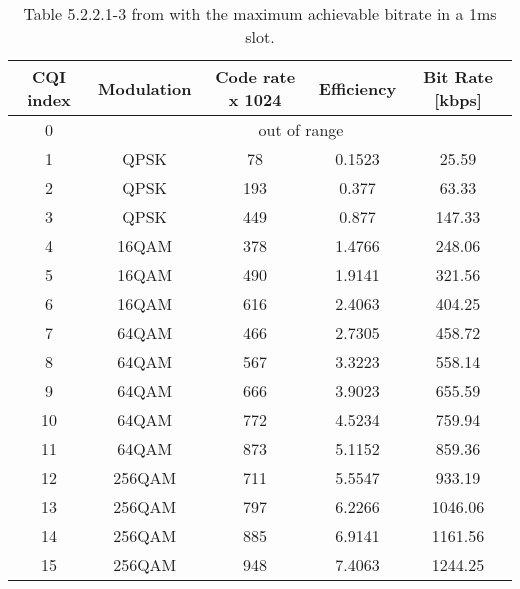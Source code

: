 \begin{itemize}
\begin{itemize}
        \begin{table}[h]
            \centering
            \caption{Table 5.2.2.1-3 from \cite{3gpp-codebooks} with the maximum achievable bitrate in a 1ms slot.}
            \label{tab:mcs}
            \begin{tabular}{|c|c|c|c|c|} 
            \hline
            CQI index & Modulation & Code rate x 1024 & Efficiency & Bit Rate [kbps]  \\ 
            \hline
            0         & \multicolumn{4}{c|}{out of range}                             \\ 
            \hline
            1         & QPSK       & 78               & 0.1523     & 25.59            \\ 
            \hline
            2         & QPSK       & 193              & 0.377      & 63.33            \\ 
            \hline
            3         & QPSK       & 449              & 0.877      & 147.33           \\ 
            \hline
            4         & 16QAM      & 378              & 1.4766     & 248.06           \\ 
            \hline
            5         & 16QAM      & 490              & 1.9141     & 321.56           \\ 
            \hline
            6         & 16QAM      & 616              & 2.4063     & 404.25           \\ 
            \hline
            7         & 64QAM      & 466              & 2.7305     & 458.72           \\ 
            \hline
            8         & 64QAM      & 567              & 3.3223     & 558.14           \\ 
            \hline
            9         & 64QAM      & 666              & 3.9023     & 655.59           \\ 
            \hline
            10        & 64QAM      & 772              & 4.5234     & 759.94           \\ 
            \hline
            11        & 64QAM      & 873              & 5.1152     & 859.36           \\ 
            \hline
            12        & 256QAM     & 711              & 5.5547     & 933.19           \\ 
            \hline
            13        & 256QAM     & 797              & 6.2266     & 1046.06          \\ 
            \hline
            14        & 256QAM     & 885              & 6.9141     & 1161.56          \\ 
            \hline
            15        & 256QAM     & 948              & 7.4063     & 1244.25          \\
            \hline
            \end{tabular}
        \end{table}

    \end{itemize}
\end{itemize}
